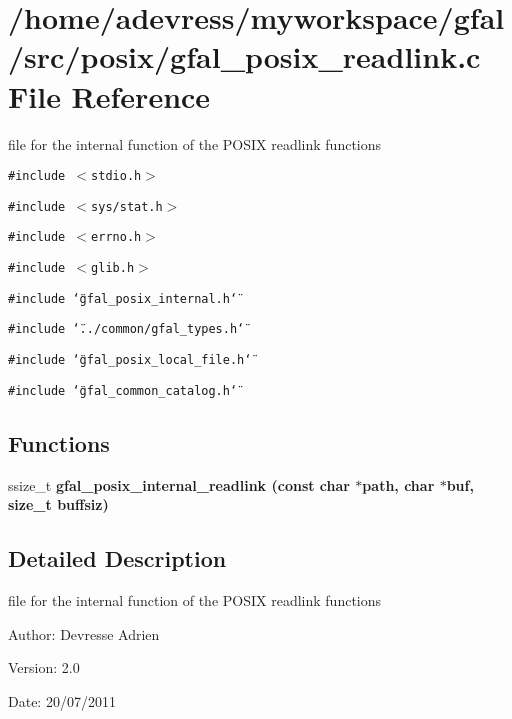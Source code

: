 \section{/home/adevress/myworkspace/gfal/src/posix/gfal\_\-posix\_\-readlink.c File Reference}
\label{gfal__posix__readlink_8c}
file for the internal function of the POSIX readlink functions 

{\tt \#include $<$stdio.h$>$}\par
{\tt \#include $<$sys/stat.h$>$}\par
{\tt \#include $<$errno.h$>$}\par
{\tt \#include $<$glib.h$>$}\par
{\tt \#include \char`\"{}gfal\_\-posix\_\-internal.h\char`\"{}}\par
{\tt \#include \char`\"{}../common/gfal\_\-types.h\char`\"{}}\par
{\tt \#include \char`\"{}gfal\_\-posix\_\-local\_\-file.h\char`\"{}}\par
{\tt \#include \char`\"{}gfal\_\-common\_\-catalog.h\char`\"{}}\par
\subsection*{Functions}
\begin{CompactItemize}
\item 
ssize\_\-t \bf{gfal\_\-posix\_\-internal\_\-readlink} (const char $\ast$path, char $\ast$buf, size\_\-t buffsiz)
\end{CompactItemize}


\subsection{Detailed Description}
file for the internal function of the POSIX readlink functions 

\begin{Desc}
\item[Author:]Devresse Adrien \end{Desc}
\begin{Desc}
\item[Version:]2.0 \end{Desc}
\begin{Desc}
\item[Date:]20/07/2011 \end{Desc}



